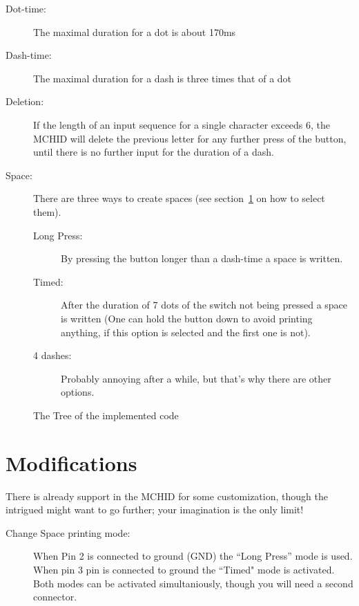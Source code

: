 \documentclass[a5paper,12pt]{article}
\begin{document}
    \begin{description}

        \item[Dot-time:] The maximal duration for a dot is about 170ms
        \item[Dash-time:] The maximal duration for a dash is three times that of a dot
        \item[Deletion:] If the length of an input sequence for a single character exceeds 6, the MCHID will delete the previous letter for any further press of the button, until there is no further input for the duration of a dash.
        \item[Space:] There are three ways to create spaces (see section~\ref{modifications} on how to select them).
            \begin{description}
            \item[Long Press:] By pressing the button longer than a dash-time a space is written.
            \item[Timed:] After the duration of 7 dots of the switch not being pressed a space is written (One can hold the button down to avoid printing anything, if this option is selected and the first one is not).
            \item[4 dashes:] Probably annoying after a while, but that's why there are other options.
            \end{description}
    \end{description}

    \begin{center}
    \label{morseTree}
    \begin{sidewaysfigure}[H]
    
        \caption{The Tree of the implemented code}
        \label{fig:morseTree}
    \end{sidewaysfigure}
    \end{center}
    \section{Modifications}\label{modifications}
    There is already support in the MCHID for some customization, though the intrigued might want to go further; your imagination is the only limit!

    \begin{description}
        \item[Change Space printing mode:] When Pin 2 is connected to ground (GND) the ``Long Press'' mode is used.\\
        When pin 3 pin is connected to ground the ``Timed" mode is activated.\\
        Both modes can be activated simultaniously, though you will need a second connector.
    \end{description}
\end{document}
